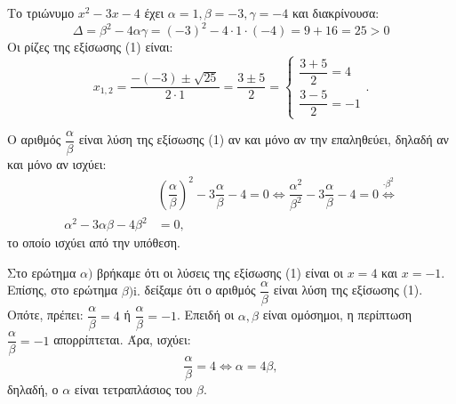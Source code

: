 
\begin{alist}
\item Το τριώνυμο $x^2 - 3x - 4$ έχει $\alpha = 1, \beta = -3, \gamma = -4$ και διακρίνουσα:
\[\Delta = \beta^2 - 4\alpha\gamma = (-3)^2 - 4 \cdot 1 \cdot (-4) = 9 + 16 = 25 > 0\]
Οι ρίζες της εξίσωσης (1) είναι:
\[x_{1,2} = \dfrac{-(-3) \pm \sqrt{25}}{2 \cdot 1} = \dfrac{3 \pm 5}{2} = \begin{cases} \dfrac{3 + 5}{2} = 4 \\ \dfrac{3 - 5}{2} = -1 \end{cases}.\]

\item 
\begin{rlist}
\item Ο αριθμός $\dfrac{\alpha}{\beta}$ είναι λύση της εξίσωσης (1) αν και μόνο αν την επαληθεύει, δηλαδή αν
και μόνο αν ισχύει:
\begin{align*}
&\left(\dfrac{\alpha}{\beta}\right)^2 - 3\dfrac{\alpha}{\beta} - 4 = 0 \Leftrightarrow \dfrac{\alpha^2}{\beta^2} - 3\dfrac{\alpha}{\beta} - 4 = 0 \stackrel{\cdot \beta^2}{\Leftrightarrow} \\
\alpha^2 - 3\alpha\beta - 4\beta^2 &= 0,
\end{align*}
το οποίο ισχύει από την υπόθεση.

\item Στο ερώτημα $\alpha)$ βρήκαμε ότι οι λύσεις της εξίσωσης (1) είναι οι $x = 4$ και $x = -1$.
Επίσης, στο ερώτημα $\beta\text{)i.}$ δείξαμε ότι ο αριθμός $\dfrac{\alpha}{\beta}$ είναι λύση της εξίσωσης (1).
Οπότε, πρέπει:
$\dfrac{\alpha}{\beta} = 4$ ή $\dfrac{\alpha}{\beta} = -1$.
Επειδή οι $\alpha, \beta$ είναι ομόσημοι, η περίπτωση $\dfrac{\alpha}{\beta} = -1$ απορρίπτεται. Άρα, ισχύει:
\[\dfrac{\alpha}{\beta} = 4 \Leftrightarrow \alpha = 4\beta,\]
δηλαδή, ο $\alpha$ είναι τετραπλάσιος του $\beta$.
\end{rlist}
\end{alist}


